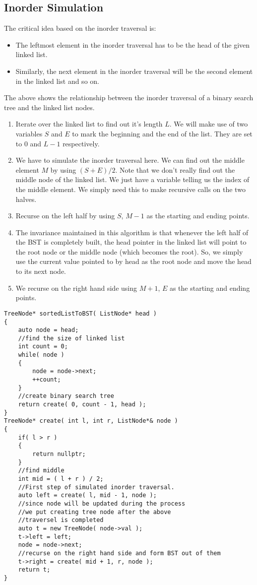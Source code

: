 \subsection{Inorder Simulation}
The critical idea based on the inorder traversal is:

\begin{itemize}
\item The leftmost element in the inorder traversal has to be the head of the given linked list.
\item Similarly, the next element in the inorder traversal will be the second element in the linked list and so on.
\end{itemize}

The above shows the relationship between the inorder traversal of a binary search tree and the linked list nodes.

\begin{enumerate}
\item Iterate over the linked list to find out it's length $L$. We will make use of two variables $S$ and $E$ to mark the beginning and the end of the list. They are set to 0 and $L - 1$ respectively.
\item We have to simulate the inorder traversal here. We can find out the middle element $M$ by using $(S + E) / 2$. Note that we don't really find out the middle node of the linked list. We just have a variable telling us the index of the middle element. We simply need this to make recursive calls on the two halves.
\item Recurse on the left half by using $S$, $M- 1$ as the starting and ending points.
\item The invariance maintained in this algorithm is that whenever the left half of the BST is completely built, the head pointer in the linked list will point to the root node or the middle node (which becomes the root). So, we simply use the current value pointed to by head as the root node and move the head to its next node.
\item We recurse on the right hand side using $M + 1$, $E$ as the starting and ending points.
\end{enumerate}

\begin{lstlisting}[style=customc, caption={Inorder Simulation}]
TreeNode* sortedListToBST( ListNode* head )
{
    auto node = head;
    //find the size of linked list
    int count = 0;
    while( node )
    {
        node = node->next;
        ++count;
    }
    //create binary search tree
    return create( 0, count - 1, head );
}
TreeNode* create( int l, int r, ListNode*& node )
{
    if( l > r )
    {
        return nullptr;
    }
    //find middle
    int mid = ( l + r ) / 2;
    //First step of simulated inorder traversal.
    auto left = create( l, mid - 1, node );
    //since node will be updated during the process
    //we put creating tree node after the above
    //traversel is completed
    auto t = new TreeNode( node->val );
    t->left = left;
    node = node->next;
    //recurse on the right hand side and form BST out of them
    t->right = create( mid + 1, r, node );
    return t;
}
\end{lstlisting}